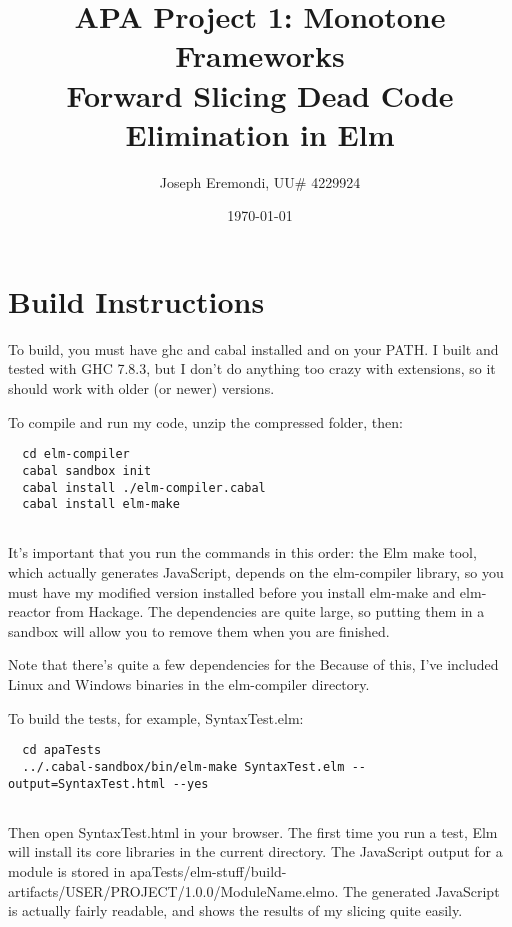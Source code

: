 \documentclass{article}
\title{APA Project 1: Monotone Frameworks\\
Forward Slicing Dead Code Elimination in Elm}
\author{Joseph Eremondi, UU\# 4229924}
\date{\today}
\begin{document}
\maketitle

\section{Build Instructions}

To build, you must have ghc and cabal installed and on your PATH.
I built and tested with GHC 7.8.3, but I don't do anything too crazy with extensions,
so it should work with older (or newer) versions.

To compile and run my code, unzip the compressed folder, then:

\begin{verbatim}
  cd elm-compiler
  cabal sandbox init
  cabal install ./elm-compiler.cabal
  cabal install elm-make
               
\end{verbatim}

It's important that you run the commands in this order: the Elm make tool, which actually generates JavaScript, depends on the elm-compiler library, so you must have my modified version installed before
you install elm-make and elm-reactor from Hackage.
The dependencies are quite large, so putting them in a sandbox will allow you to remove them when you
are finished.

Note that there's quite a few dependencies for the 
Because of this, I've included Linux and Windows binaries in the elm-compiler directory. %

To build the tests, for example, SyntaxTest.elm:

\begin{verbatim}
  cd apaTests
  ../.cabal-sandbox/bin/elm-make SyntaxTest.elm --output=SyntaxTest.html --yes
               
\end{verbatim}

Then open SyntaxTest.html in your browser.
The first time you run a test, Elm will install its core libraries in the current directory.
The JavaScript output for a module is stored in apaTests/elm-stuff/build-artifacts/USER/PROJECT/1.0.0/ModuleName.elmo. The generated JavaScript is actually fairly readable, and shows the results of
my slicing quite easily.
\end{document}
